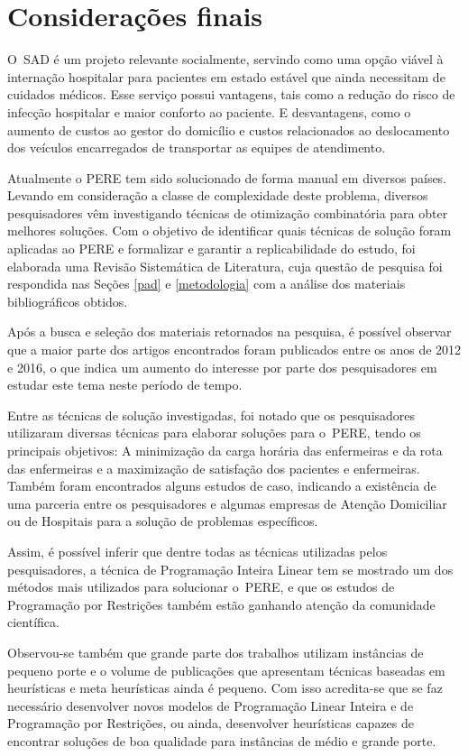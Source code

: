 \section{\esp Considerações finais }\label{conclusão}

O~\ac{SAD} é um projeto relevante socialmente, servindo como uma opção viável à internação hospitalar para pacientes em estado estável que ainda necessitam de cuidados médicos. Esse serviço possui vantagens, tais como a redução do risco de infecção hospitalar e maior conforto ao paciente. E desvantagens, como o aumento de custos ao gestor do domicílio e custos relacionados ao deslocamento dos veículos encarregados de transportar as equipes de atendimento.

Atualmente o \ac{PERE} tem sido solucionado de forma manual em diversos países. Levando em consideração a classe de complexidade deste problema, diversos pesquisadores vêm investigando técnicas de otimização combinatória para obter melhores soluções. Com o objetivo de identificar quais técnicas de solução foram aplicadas ao \ac{PERE} e formalizar e garantir a replicabilidade do estudo, foi elaborada uma Revisão Sistemática de Literatura, cuja questão de pesquisa foi respondida nas Seções \ref{pad} e \ref{metodologia} com a análise dos materiais bibliográficos obtidos.

Após a busca e seleção dos materiais retornados na pesquisa, é  possível observar que a maior parte dos artigos encontrados foram publicados entre os anos de 2012 e 2016, o que indica um aumento do interesse por parte dos pesquisadores em estudar este tema neste período de tempo. 

Entre as técnicas de solução investigadas, foi notado que os pesquisadores utilizaram diversas técnicas para elaborar soluções para o~\ac{PERE}, tendo os principais objetivos: A minimização da carga horária das enfermeiras e da rota das enfermeiras e a maximização de satisfação dos pacientes e enfermeiras. Também foram encontrados alguns estudos de caso, indicando a existência de uma parceria entre os pesquisadores e algumas empresas de Atenção Domiciliar ou de Hospitais para a solução de problemas específicos.

Assim, é possível inferir que dentre todas as técnicas utilizadas pelos pesquisadores, a técnica de Programação Inteira Linear tem se mostrado um dos métodos mais utilizados para solucionar o~\ac{PERE}, e que os estudos de Programação por Restrições também estão ganhando atenção da comunidade científica. 

Observou-se também que grande parte dos trabalhos utilizam instâncias de pequeno porte e o volume de publicações que apresentam técnicas baseadas em heurísticas e meta heurísticas ainda é pequeno. Com isso acredita-se que se faz necessário desenvolver novos modelos de Programação Linear Inteira e de Programação por Restrições, ou ainda, desenvolver heurísticas capazes de encontrar soluções de boa qualidade para instâncias de médio e grande porte.
